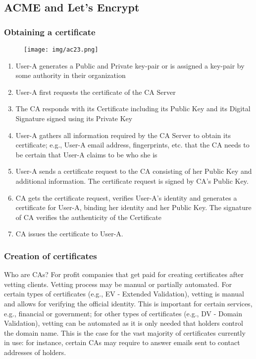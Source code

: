 \documentclass[a4paper, 10pt, titlepage]{article}
\begin{document}
\subsection{ACME and Let's Encrypt}
\subsubsection{Obtaining a certificate}
\begin{figure}[h]
\centering
\texttt{[image: img/ac23.png]}
\end{figure}
\begin{enumerate}
\item User-A generates a Public and Private key-pair or is assigned a key-pair by some authority in their organization
\item User-A first requests the certificate of the CA Server
\item The CA responds with its Certificate including its Public Key and its Digital Signature signed using its Private Key
\item User-A gathers all information required by the CA Server to obtain its certificate; e.g., User-A email address, fingerprints, etc. that the CA needs to be certain that User-A claims to be who she is
\item User-A sends a certificate request to the CA consisting of her Public Key and additional information. The certificate request is signed by CA's Public Key.
\item CA gets the certificate request, verifies User-A's identity and generates a certificate for User-A, binding her identity and her Public Key. The signature of CA verifies the authenticity of the Certificate 
\item CA issues the certificate to User-A.
\end{enumerate}

\subsubsection{Creation of certificates}
Who are CAs? For profit companies that get paid for creating certificates after vetting clients. Vetting process may be manual or partially automated. For certain types of certificates (e.g., EV - Extended Validation), vetting is manual and allows for verifying the official identity. This is important for certain services, e.g., financial or government; for other types of certificates (e.g., DV - Domain Validation), vetting can be automated as it is only needed that holders control the domain name. This is the case for the vast majority of certificates currently in use: for instance, certain CAs may require to answer emails sent to contact addresses of holders.
\end{document}
